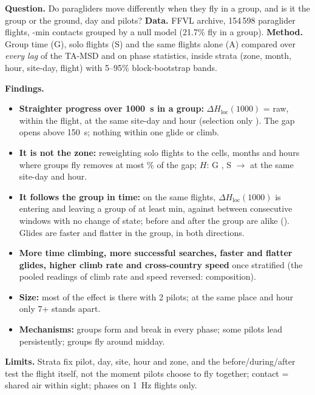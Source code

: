 \begin{summary}
\textbf{Question.} Do paragliders move differently when they fly in a group, and is it the group or the ground, day and pilots?
\textbf{Data.} FFVL archive, 154\,598 paraglider flights, \tauStar-min contacts grouped by a null model (21.7\% fly in a group).
\textbf{Method.} Group time (G), solo flights (S) and the same flights alone (A) compared over \emph{every lag} of the TA-MSD and on phase statistics,
inside strata (zone, month, hour, site-day, flight) with 5--95\% block-bootstrap bands.

\textbf{Findings.}
\begin{itemize}
  \item \textbf{Straighter progress over 1000~s in a group:} $\Delta H_\mathrm{loc}(1000)$ = \DHlocThousandRaw{} raw, \DHlocThousandFlight{} within the flight, \DHlocThousandGroupSdh{} at the same site-day and hour
        (selection only \DHlocThousandSel). The gap opens above 150~s; nothing within one glide or climb.
  \item \textbf{It is not the zone:} reweighting solo flights to the cells, months and hours where groups fly removes at most \ZoneRedLocZoneHour\% of the gap; $H$: G \ZoneHNoneG{}, S \ZoneHNoneS{} $\to$ \ZoneHSdhS{} at the same site-day and hour.
  \item \textbf{It follows the group in time:} on the same flights, $\Delta H_\mathrm{loc}(1000)$ is \PPEntryDHloc{} entering and \PPExitDHloc{} leaving a group of at least \PPWindowMin{} min,
        against \PPCtrlADHloc{} between consecutive windows with no change of state; before and after the group are alike (\PPAfterBeforeDHloc). Glides are faster and flatter in the group, in both directions.
  \item \textbf{More time climbing, more successful searches, faster and flatter glides, higher climb rate and cross-country speed} once stratified (the pooled readings of climb rate and speed reversed: composition).
  \item \textbf{Size:} most of the effect is there with 2 pilots; at the same place and hour only 7+ stands apart.
  \item \textbf{Mechanisms:} groups form and break in every phase; some pilots lead persistently; groups fly around midday.
\end{itemize}
\textbf{Limits.} Strata fix pilot, day, site, hour and zone, and the before/during/after test the flight itself, not the moment pilots choose to fly together; contact = shared air within sight; phases on 1~Hz flights only.
\end{summary}
